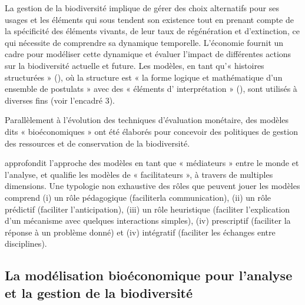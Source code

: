 La gestion de la biodiversité implique de gérer des choix alternatifs pour ses usages et les éléments qui sous tendent son existence tout en prenant compte de la spécificité des éléments vivants, de leur taux de régénération et d'extinction, ce qui nécessite de comprendre sa dynamique temporelle. L'économie fournit un cadre pour modéliser cette dynamique et évaluer l'impact de différentes actions sur la biodiversité actuelle et future. Les modèles, en tant qu'« histoires structurées » (\citep{GibbardVarian}), où la structure est « la forme logique et mathématique d'un ensemble de postulats » avec des « éléments d' interprétation » (\citep{GibbardVarian}), sont utilisés à diverses fins (voir l'encadré 3).

Parallèlement à l'évolution des techniques d'évaluation monétaire, des modèles dits « bioéconomiques » ont été élaborés pour concevoir des politiques de gestion des ressources et de conservation de la biodiversité.

\begin{tcolorbox}[breakable, 
colback=verylightgray, 
colframe=gray!75!black, 
title= {Box 3 - Que font les modèles? },
fontupper=\small]

\cite{varenne_epistemologie_2014} approfondit l'approche des modèles en tant que « médiateurs » entre le monde et l'analyse,  et qualifie les modèles de « facilitateurs », à travers de multiples dimensions. Une typologie non exhaustive des rôles que peuvent jouer les modèles comprend (i) un rôle pédagogique (faciliterla communication), (ii) un rôle prédictif (faciliter l'anticipation), (iii) un rôle heuristique (faciliter l'explication d'un mécanisme avec quelques interactions simples), (iv) prescriptif (faciliter la réponse à un problème donné) et (iv) intégratif (faciliter les échanges entre disciplines). 

\end{tcolorbox}

{}
\subsection*{La modélisation bioéconomique pour l'analyse et la gestion de la biodiversité}


